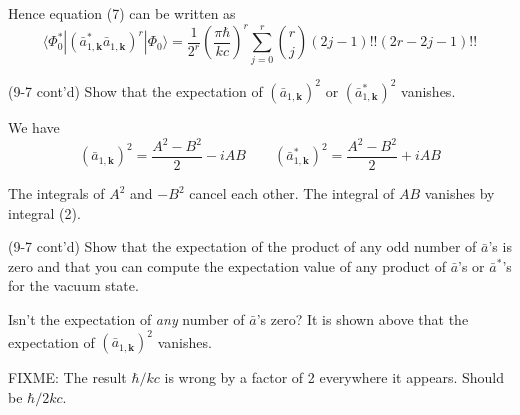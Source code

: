 \documentclass[12pt]{article}
\begin{document}
Hence equation (7) can be written as
\begin{equation*}
\langle\Phi_0^*|(\bar a_{1,\mathbf k}^*\bar a_{1,\mathbf k})^r|\Phi_0\rangle
=\frac{1}{2^r}
\left(\frac{\pi\hbar}{kc}\right)^r
\sum_{j=0}^r\binom{r}{j}
(2j-1)!!(2r-2j-1)!!
\end{equation*}

(9-7 cont'd)
Show that the expectation of 
$(\bar a_{1,\mathbf k})^2$ or
$(\bar a_{1,\mathbf k}^*)^2$ vanishes.

\bigskip
We have
\begin{equation*}
(\bar a_{1,\mathbf k})^2=\frac{A^2-B^2}{2}-iAB
\qquad
(\bar a_{1,\mathbf k}^*)^2=\frac{A^2-B^2}{2}+iAB
\end{equation*}

The integrals of $A^2$ and $-B^2$ cancel each other.
The integral of $AB$ vanishes by integral (2).

\bigskip
(9-7 cont'd)
Show that the expectation of the product of any odd number of
$\bar a$'s is zero and that you can compute the expectation value of
any product of $\bar a$'s or $\bar a^*$'s for the vacuum state.

\bigskip
Isn't the expectation of {\it any} number of $\bar a$'s zero?
It is shown above that the expectation of $(\bar a_{1,\mathbf k})^2$ vanishes.

\bigskip
FIXME: The result $\hbar/kc$ is wrong by a factor of 2 everywhere it appears.
Should be $\hbar/2kc$.
\end{document}
